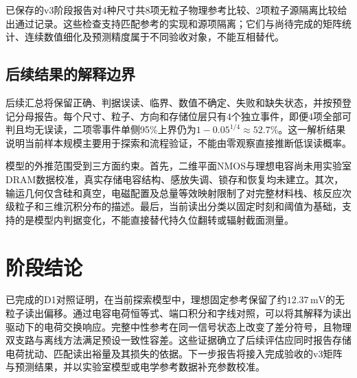 \documentclass[UTF8,a4paper,zihao=-4,fontset=fandol]{ctexart}
\newcommand{\mV}{\,\mathrm{mV}}
\begin{document}
已保存的v3阶段报告对4种尺寸共8项无粒子物理参考比较、2项粒子源隔离比较给出通过记录\cite{v3snapshot}。这些检查支持匹配参考的实现和源项隔离；它们与尚待完成的矩阵统计、连续数值细化及预测精度属于不同验收对象，不能互相替代。

\subsection{后续结果的解释边界}
后续汇总将保留正确、判据误读、临界、数值不确定、失败和缺失状态，并按预登记分母报告。每个尺寸、粒子、方向和存储位层只有4个独立事件，即便4项全部可判且均无误读，二项零事件单侧95\%上界仍为$1-0.05^{1/4}\approx52.7\%$。这一解析结果说明当前样本规模主要用于探索和流程验证，不能由零观察直接推断低误读概率。

模型的外推范围受到三方面约束。首先，二维平面NMOS与理想电容尚未用实验室DRAM数据校准，真实存储电容结构、感放失调、锁存和恢复均未建立。其次，输运几何仅含硅和真空，电磁配置及总量等效映射限制了对完整材料栈、核反应次级粒子和三维沉积分布的描述。最后，当前读出分类以固定时刻和阈值为基础，支持的是模型内判据变化，不能直接替代持久位翻转或辐射截面测量。

\section{阶段结论}
已完成的D1对照证明，在当前探索模型中，理想固定参考保留了约$12.37\mV$的无粒子读出偏移。通过电容电荷恒等式、端口积分和字线对照，可以将其解释为读出驱动下的电荷交换响应。完整中性参考在同一信号状态上改变了差分符号，且物理双支路与离线方法满足预设一致性容差。这些证据确立了后续评估应同时报告存储电荷扰动、匹配读出裕量及其损失的依据。下一步报告将接入完成验收的v3矩阵与预测结果，并以实验室模型或电学参考数据补充参数校准。
\end{document}
